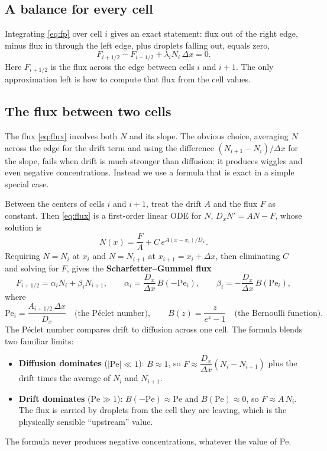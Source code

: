 \documentclass[11pt]{article}
\newcommand{\Pe}{\mathrm{Pe}}
\begin{document}
\subsection{A balance for every cell}
Integrating \eqref{eq:fp} over cell $i$ gives an exact statement: flux out of the right edge, minus flux in through the left edge, plus droplets falling out, equals zero,
\begin{equation}\label{eq:cellbalance}
F_{i+1/2} - F_{i-1/2} + \lambda_i N_i\,\Delta x = 0 .
\end{equation}
Here $F_{i+1/2}$ is the flux across the edge between cells $i$ and $i+1$. The only approximation left is how to compute that flux from the cell values.

\subsection{The flux between two cells}
The flux \eqref{eq:flux} involves both $N$ and its slope. The obvious choice, averaging $N$ across the edge for the drift term and using the difference $(N_{i+1}-N_i)/\Delta x$ for the slope, fails when drift is much stronger than diffusion: it produces wiggles and even negative concentrations. Instead we use a formula that is exact in a simple special case.

Between the centers of cells $i$ and $i+1$, treat the drift $A$ and the flux $F$ as constant. Then \eqref{eq:flux} is a first-order linear ODE for $N$, $D_x N' = A N - F$, whose solution is
\[
N(x) = \frac{F}{A} + C\,e^{A(x-x_i)/D_x}.
\]
Requiring $N = N_i$ at $x_i$ and $N = N_{i+1}$ at $x_{i+1} = x_i + \Delta x$, then eliminating $C$ and solving for $F$, gives the \textbf{Scharfetter--Gummel flux}
\begin{equation}\label{eq:sg}
F_{i+1/2} = \alpha_i N_i + \beta_i N_{i+1},\qquad
\alpha_i = \frac{D_x}{\Delta x}\,B(-\Pe_i),\qquad
\beta_i = -\frac{D_x}{\Delta x}\,B(\Pe_i),
\end{equation}
where
\[
\Pe_i = \frac{A_{i+1/2}\,\Delta x}{D_x}\quad\text{(the Péclet number)},\qquad
B(z) = \frac{z}{e^z - 1}\quad\text{(the Bernoulli function)} .
\]
The Péclet number compares drift to diffusion across one cell. The formula blends two familiar limits:
\begin{itemize}
\item \textbf{Diffusion dominates} ($|\Pe|\ll1$): $B\approx1$, so $F \approx \dfrac{D_x}{\Delta x}(N_i - N_{i+1})$ plus the drift times the average of $N_i$ and $N_{i+1}$.
\item \textbf{Drift dominates} ($\Pe\gg1$): $B(-\Pe)\approx\Pe$ and $B(\Pe)\approx0$, so $F\approx A\,N_i$. The flux is carried by droplets from the cell they are leaving, which is the physically sensible ``upstream'' value.
\end{itemize}
The formula never produces negative concentrations, whatever the value of $\Pe$.
\end{document}
